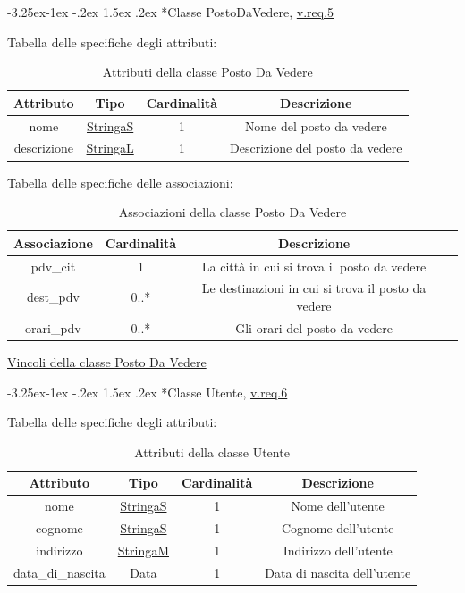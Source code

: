 \documentclass{article}
\makeatletter
\renewcommand\subsection{\@startsection{subsection}{2}{\z@}%
                                     {-3.25ex\@plus -1ex \@minus -.2ex}%
                                     {1.5ex \@plus .2ex}%
                                     {\normalfont\normalsize\bfseries}}
\makeatother
\begin{document}
\subsection*{Classe PostoDaVedere, \hyperref[sec:RequisitiPostoDaVedere]{v.req.5}}\label{sec:PostoDaVedere}

Tabella delle specifiche degli attributi:
\begin{table}[h!]
    \centering
    \begin{tabular}{|c|c|c|c|}
        \hline
        Attributo & Tipo & Cardinalità & Descrizione \\
        \hline
        nome & \hyperref[sec:StringaS]{StringaS} & 1 & Nome del posto da vedere \\
        descrizione & \hyperref[sec:StringaL]{StringaL} & 1 & Descrizione del posto da vedere \\
        \hline
    \end{tabular}
    \caption{Attributi della classe Posto Da Vedere}
\end{table}

Tabella delle specifiche delle associazioni:
\begin{table}[h!]
    \centering
    \begin{tabular}{|c|c|c|c|}
        \hline
        Associazione & Cardinalità & Descrizione \\
        \hline
        pdv\_cit & 1 & La città in cui si trova il posto da vedere \\
        dest\_pdv & 0..* & Le destinazioni in cui si trova il posto da vedere \\
        orari\_pdv & 0..* & Gli orari del posto da vedere \\
        \hline
    \end{tabular}
    \caption{Associazioni della classe Posto Da Vedere}
\end{table}

\hyperref[sec:VincoliPostoDaVedere]{Vincoli della classe Posto Da Vedere}

\subsection*{Classe Utente, \hyperref[sec:RequisitiUtente]{v.req.6}}\label{sec:Utente}

Tabella delle specifiche degli attributi:
\begin{table}[h!]
    \centering
    \begin{tabular}{|c|c|c|c|}
        \hline
        Attributo & Tipo & Cardinalità & Descrizione \\
        \hline
        nome & \hyperref[sec:StringaS]{StringaS} & 1 & Nome dell'utente \\
        cognome & \hyperref[sec:StringaS]{StringaS} & 1 & Cognome dell'utente \\
        indirizzo & \hyperref[sec:StringaM]{StringaM} & 1 & Indirizzo dell'utente \\
        data\_di\_nascita & Data & 1 & Data di nascita dell'utente \\
        \hline
    \end{tabular}
    \caption{Attributi della classe Utente}
\end{table}
\end{document}
